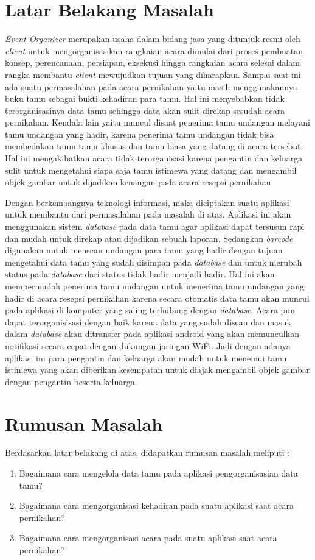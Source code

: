 \documentclass{jtetiproposalskripsi}
\begin{document}
\section{Latar Belakang Masalah}
\emph{Event Organizer} merupakan usaha dalam bidang jasa yang ditunjuk resmi oleh \emph{client} untuk mengorganisasikan rangkaian acara dimulai dari proses pembuatan konsep, perencanaan, persiapan, eksekusi hingga rangkaian acara selesai dalam rangka membantu \emph{client} mewujudkan tujuan yang diharapkan. Sampai saat ini ada suatu permasalahan pada acara pernikahan yaitu masih menggunakannya buku tamu sebagai bukti kehadiran para tamu. Hal ini menyebabkan tidak terorganisasinya data tamu sehingga data akan sulit direkap sesudah acara  pernikahan. Kendala lain yaitu muncul disaat penerima tamu undangan melayani tamu undangan yang hadir, karena penerima tamu undangan tidak bisa membedakan tamu-tamu khusus dan tamu biasa yang datang di acara tersebut. Hal ini mengakibatkan acara tidak terorganisasi karena pengantin dan keluarga sulit untuk mengetahui siapa saja tamu istimewa  yang datang dan mengambil objek gambar untuk dijadikan kenangan pada acara resepsi pernikahan.

Dengan berkembangnya teknologi informasi, maka diciptakan suatu aplikasi untuk membantu dari permasalahan pada masalah di atas. Aplikasi ini akan menggunakan sistem \emph{database} pada data tamu agar aplikasi dapat tersusun rapi dan mudah untuk direkap atau dijadikan sebuah laporan. Sedangkan \emph{barcode} digunakan untuk menscan undangan para tamu yang hadir dengan tujuan mengetahui data tamu yang sudah disimpan pada \emph{database} dan untuk merubah status pada \emph{database} dari status tidak hadir menjadi hadir. Hal ini akan mempermudah penerima tamu undangan untuk menerima tamu undangan yang hadir di acara resepsi pernikahan karena secara otomatis data tamu akan muncul pada aplikasi di komputer yang saling terhubung dengan \emph{database}. Acara pun dapat terorganisisasi dengan baik karena data yang sudah discan dan  masuk dalam \emph{database} akan ditransfer pada aplikasi android yang akan memunculkan notifikasi secara cepat dengan dukungan jaringan WiFi. Jadi dengan adanya aplikasi ini para pengantin dan keluarga  akan mudah untuk menemui tamu istimewa yang akan diberikan kesempatan untuk  diajak mengambil objek gambar dengan pengantin beserta keluarga.

\vspace{3cm}

\section{Rumusan Masalah}
Berdasarkan latar belakang di atas, didapatkan rumusan masalah meliputi : 
\begin{enumerate}[1.]
\itemsep0em
\item Bagaimana cara mengelola data tamu pada aplikasi pengorganisasian data tamu?
\item Bagaimana cara mengorganisasi kehadiran pada suatu aplikasi saat acara pernikahan?
\item Bagaimana cara mengorganisasi acara pada suatu aplikasi saat acara pernikahan?
\end{enumerate}
\end{document}
